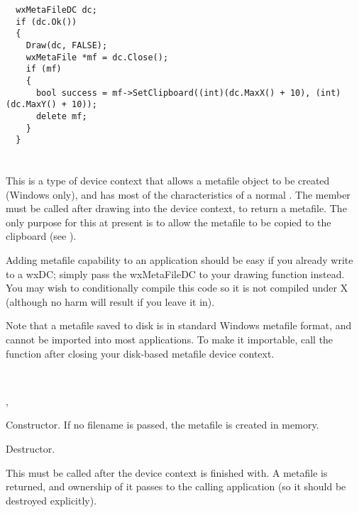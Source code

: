 \begin{verbatim}
  wxMetaFileDC dc;
  if (dc.Ok())
  {
    Draw(dc, FALSE);
    wxMetaFile *mf = dc.Close();
    if (mf)
    {
      bool success = mf->SetClipboard((int)(dc.MaxX() + 10), (int)(dc.MaxY() + 10));
      delete mf;
    }
  }
\end{verbatim}

\section{}\label{wxmetafiledc}

This is a type of device context that allows a metafile object to be
created (Windows only), and has most of the characteristics of a normal
. The  member must be called after drawing into the
device context, to return a metafile. The only purpose for this at
present is to allow the metafile to be copied to the clipboard (see ).

Adding metafile capability to an application should be easy if you
already write to a wxDC; simply pass the wxMetaFileDC to your drawing
function instead. You may wish to conditionally compile this code so it
is not compiled under X (although no harm will result if you leave it
in).

Note that a metafile saved to disk is in standard Windows metafile format,
and cannot be imported into most applications. To make it importable,
call the function  after
closing your disk-based metafile device context.


\\


, 




Constructor. If no filename is passed, the metafile is created
in memory.



Destructor.

\label{wxmetafiledcclose}


This must be called after the device context is finished with. A
metafile is returned, and ownership of it passes to the calling
application (so it should be destroyed explicitly).


